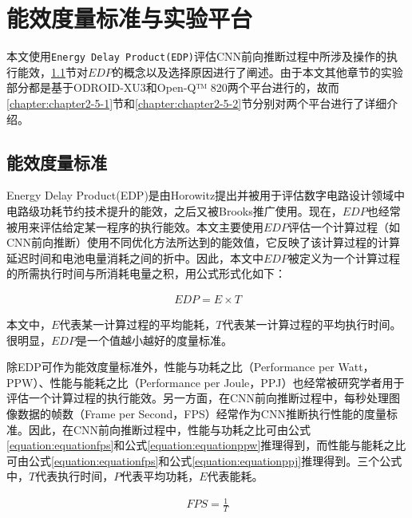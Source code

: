 \section{能效度量标准与实验平台}

本文使用\texttt{Energy Delay Product(EDP)}评估CNN前向推断过程中所涉及操作的执行能效，\ref{chapter:edp}节对$EDP$的概念以及选择原因进行了阐述。由于本文其他章节的实验部分都是基于ODROID-XU3\cite{hardkernel.com}和Open-Q™ 820\cite{intrinsyc.com}两个平台进行的，故而\ref{chapter:chapter2-5-1}节和\ref{chapter:chapter2-5-2}节分别对两个平台进行了详细介绍。

\subsection{能效度量标准}
\label{chapter:edp}

Energy Delay Product(EDP)是由Horowitz\cite{horowitz1994low}提出并被用于评估数字电路设计领域中电路级功耗节约技术提升的能效，之后又被Brooks\cite{brooks2000power}推广使用。现在，$EDP$也经常被用来评估给定某一程序的执行能效。本文主要使用$EDP$评估一个计算过程（如CNN前向推断）使用不同优化方法所达到的能效值，它反映了该计算过程的计算延迟时间和电池电量消耗之间的折中。因此，本文中$EDP$被定义为一个计算过程的所需执行时间与所消耗电量之积，用公式形式化如下：

\begin{equation}
     \label{equation:equation1}
     \begin{aligned}
        EDP = E \times T
     \end{aligned}
\end{equation}

\noindent 本文中，$E$代表某一计算过程的平均能耗，$T$代表某一计算过程的平均执行时间。很明显，$EDP$是一个值越小越好的度量标准。

除EDP可作为能效度量标准外，性能与功耗之比（Performance per Watt，PPW）、性能与能耗之比（Performance per Joule，PPJ）也经常被研究学者用于评估一个计算过程的执行能效。另一方面，在CNN前向推断过程中，每秒处理图像数据的帧数（Frame per Second，FPS\cite{wang2017building}）经常作为CNN推断执行性能的度量标准。因此，在CNN前向推断过程中，性能与功耗之比可由公式\ref{equation:equationfps}和公式\ref{equation:equationppw}推理得到，而性能与能耗之比可由公式\ref{equation:equationfps}和公式\ref{equation:equationppj}推理得到。三个公式中，$T$代表执行时间，$P$代表平均功耗，$E$代表能耗。

\begin{equation}
     \label{equation:equationfps}
     \begin{aligned}
        FPS = \frac{1}{T}
     \end{aligned}
\end{equation}

